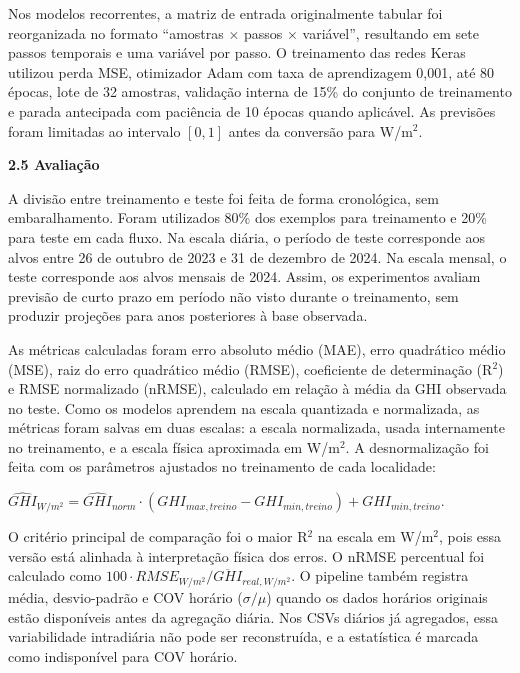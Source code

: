 \documentclass[12pt,a4paper]{article}
\begin{document}
Nos modelos recorrentes, a matriz de entrada originalmente tabular foi reorganizada no formato ``amostras $\times$ passos $\times$ variável'', resultando em sete passos temporais e uma variável por passo. O treinamento das redes Keras utilizou perda MSE, otimizador Adam com taxa de aprendizagem 0,001, até 80 épocas, lote de 32 amostras, validação interna de 15\% do conjunto de treinamento e parada antecipada com paciência de 10 épocas quando aplicável. As previsões foram limitadas ao intervalo $[0,1]$ antes da conversão para W/m$^2$.

\vspace{12pt}

\noindent\textbf{2.5 Avaliação}

A divisão entre treinamento e teste foi feita de forma cronológica, sem embaralhamento. Foram utilizados 80\% dos exemplos para treinamento e 20\% para teste em cada fluxo. Na escala diária, o período de teste corresponde aos alvos entre 26 de outubro de 2023 e 31 de dezembro de 2024. Na escala mensal, o teste corresponde aos alvos mensais de 2024. Assim, os experimentos avaliam previsão de curto prazo em período não visto durante o treinamento, sem produzir projeções para anos posteriores à base observada.

As métricas calculadas foram erro absoluto médio (MAE), erro quadrático médio (MSE), raiz do erro quadrático médio (RMSE), coeficiente de determinação (R$^2$) e RMSE normalizado (nRMSE), calculado em relação à média da GHI observada no teste. Como os modelos aprendem na escala quantizada e normalizada, as métricas foram salvas em duas escalas: a escala normalizada, usada internamente no treinamento, e a escala física aproximada em W/m$^2$. A desnormalização foi feita com os parâmetros ajustados no treinamento de cada localidade:

\vspace{6pt}

\begin{center}
$\widehat{GHI}_{W/m^2} = \widehat{GHI}_{norm} \cdot (GHI_{max,treino} - GHI_{min,treino}) + GHI_{min,treino}$.
\end{center}

\vspace{6pt}

O critério principal de comparação foi o maior R$^2$ na escala em W/m$^2$, pois essa versão está alinhada à interpretação física dos erros. O nRMSE percentual foi calculado como $100 \cdot RMSE_{W/m^2} / \overline{GHI}_{real,W/m^2}$. O pipeline também registra média, desvio-padrão e COV horário ($\sigma/\mu$) quando os dados horários originais estão disponíveis antes da agregação diária. Nos CSVs diários já agregados, essa variabilidade intradiária não pode ser reconstruída, e a estatística é marcada como indisponível para COV horário.
\end{document}
